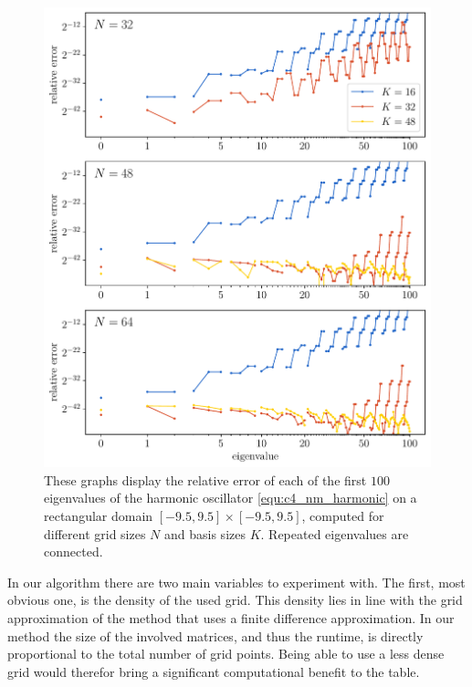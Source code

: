 \begin{figure}
    \begin{center}
        \includegraphics[width=\textwidth]{img/chapter4/nm_test_harmonic.pdf}
    \end{center}
    \caption{These graphs display the relative error of each of the first $100$ eigenvalues of the harmonic oscillator \eqref{equ:c4_nm_harmonic} on a rectangular domain $[-9.5,9.5]\times[-9.5, 9.5]$, computed for different grid sizes $N$ and basis sizes $K$. Repeated eigenvalues are connected.}
    \label{fig:c4_nm_harmonic_rectangle}
\end{figure}

In our algorithm there are two main variables to experiment with. The first, most obvious one, is the density of the used grid. This density lies in line with the grid approximation of the method that uses a finite difference approximation. In our method the size of the involved matrices, and thus the runtime, is directly proportional to the total number of grid points. Being able to use a less dense grid would therefor bring a significant computational benefit to the table.

